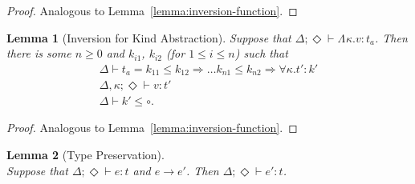 \documentclass{article}
\newcommand{\KVAR}{\kappa}
\newcommand{\ONE}{\circ}
\newcommand{\KALL}[1]{\forall#1.}
\newcommand{\KLAM}[2][{}]{\Lambda^{#1}#2.}
\newcommand{\KENV}{\Delta}
\newcommand{\TENVEMPTY}{\Diamond}
\newcommand\stepsto{\longrightarrow}
\newtheorem{lemma}{Lemma}
\begin{document}
\begin{proof}
  Analogous to Lemma~\ref{lemma:inversion-function}.
\end{proof}
\begin{lemma}[Inversion for Kind Abstraction]\label{lemma:inversion-kind-abstraction}
  Suppose that $\KENV; \TENVEMPTY \vdash \KLAM\KVAR v : t_a$.
  Then there is some $n\ge0$ and $k_{i1}$, $k_{i2}$ (for $1\le i\le n$) such that 
  \begin{gather}
    \KENV \vdash t_a = k_{11}\le k_{12}\Rightarrow \dots k_{n1}\le k_{n2} \Rightarrow \KALL \KVAR t' : k'
    \\
    \KENV, \KVAR; \TENVEMPTY \vdash v : t'
    \\
    \KENV \vdash k' \le \ONE
    \mathrm{.}
  \end{gather}
\end{lemma}
\begin{proof}
  Analogous to Lemma~\ref{lemma:inversion-function}.
\end{proof}
\begin{lemma}[Type Preservation]~\\
  Suppose that $\KENV; \TENVEMPTY \vdash e : t$ and $e \stepsto e'$.
  Then $\KENV;\TENVEMPTY \vdash e' : t$.
\end{lemma}
\end{document}
